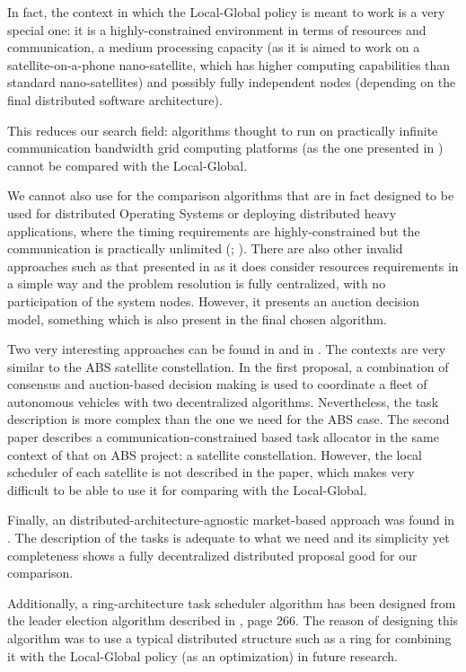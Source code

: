 In fact, the context in which the Local-Global policy is meant to work is a very special one: it is a highly-constrained environment in terms of resources and communication, a medium processing capacity (as it is aimed to work on a satellite-on-a-phone nano-satellite, which has higher computing capabilities than standard nano-satellites) and possibly fully independent nodes (depending on the final distributed software architecture).

This reduces our search field: algorithms thought to run on practically infinite communication bandwidth grid computing platforms (as the one presented in \cite{servers}) cannot be compared with the Local-Global.

We cannot also use for the comparison algorithms that are in fact designed to be used for distributed Operating Systems or deploying distributed heavy applications, where the timing requirements are highly-constrained but the communication is practically unlimited (\cite{anderson2007consensus}; \cite{pilloni2012decentralized}). There are also other invalid approaches such as that presented in \cite{luo2013distributed} as it does consider resources requirements in a simple way and the problem resolution is fully centralized, with no participation of the system nodes. However, it presents an auction decision model, something which is also present in the final chosen algorithm.

Two very interesting approaches can be found in \cite{choi2009consensus} and in \cite{bonnet2008coordination}. The contexts are very similar to the ABS satellite constellation. In the first proposal, a combination of consensus and auction-based decision making is used to coordinate a fleet of autonomous vehicles with two decentralized algorithms. Nevertheless, the task description is more complex than the one we need for the ABS case. The second paper describes a communication-constrained based task allocator in the same context of that on ABS project: a satellite constellation. However, the local scheduler of each satellite is not described in the paper, which makes very difficult to be able to use it for comparing with the Local-Global.

Finally, an distributed-architecture-agnostic market-based approach was found in \citep{Edalat09}. The description of the tasks is adequate to what we need and its simplicity yet completeness shows a fully decentralized distributed proposal good for our comparison.

Additionally, a ring-architecture task scheduler algorithm has been designed from the leader election algorithm described in \cite{Tanenbaum:2006:DSP:1202502}, page 266. The reason of designing this algorithm was to use a typical distributed structure such as a ring for combining it with the Local-Global policy (as an optimization) in future research.

